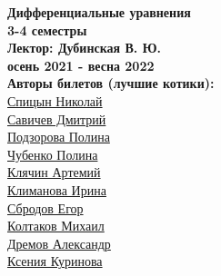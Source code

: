 


    \thispagestyle{empty}
    \BgThispage
    \begin{center}
        \vspace*{4cm}
        
        \Huge
        \textbf{Дифференциальные уравнения} \\
        \textbf{3-4 семестры} \\
        \textbf{Лектор: Дубинская В. Ю.} \\
        \textbf{осень 2021 - весна 2022} \\
    
        
        \vspace{7cm}
        \Large
        \textbf{Авторы билетов (лучшие котики):} \\
        \href{https://vk.com/spitsynn}{Спицын Николай} \\
        \href{https://vk.com/dimasav123}{Савичев Дмитрий} \\
        \href{https://vk.com/id165779384}{Подзорова Полина} \\
        \href{https://vk.com/poli.dobro}{Чубенко Полина} \\
        \href{https://vk.com/id340504554}{Клячин Артемий} \\
        \href{https://vk.com/meraklim}{Климанова Ирина} \\
        \href{https://vk.com/ulegor}{Сбродов Егор} \\
        \href{https://vk.com/id153425653}{Колтаков Михаил} \\
        \href{https://vk.com/aldrmv}{Дремов Александр} \\
        \href{https://vk.com/ksinomorph}{Ксения Куринова}
    \end{center}

\newpage

\tableofcontents
\newpage





